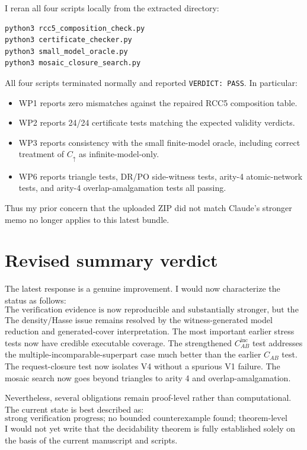 \documentclass[11pt]{article}
\begin{document}
I reran all four scripts locally from the extracted directory:
\begin{verbatim}
python3 rcc5_composition_check.py
python3 certificate_checker.py
python3 small_model_oracle.py
python3 mosaic_closure_search.py
\end{verbatim}
All four scripts terminated normally and reported \texttt{VERDICT: PASS}.  In particular:
\begin{itemize}[leftmargin=2em]
  \item WP1 reports zero mismatches against the repaired RCC5 composition table.
  \item WP2 reports 24/24 certificate tests matching the expected validity verdicts.
  \item WP3 reports consistency with the small finite-model oracle, including correct treatment of \(C_\uparrow\) as infinite-model-only.
  \item WP6 reports triangle tests, DR/PO side-witness tests, arity-4 atomic-network tests, and arity-4 overlap-amalgamation tests all passing.
\end{itemize}

Thus my prior concern that the uploaded ZIP did not match Claude's stronger memo no longer applies to this latest bundle.

\section{Revised summary verdict}

The latest response is a genuine improvement.  I would now characterize the status as follows:
\[
\boxed{\text{The verification evidence is now reproducible and substantially stronger, but the proof is not yet fully certified.}}
\]
The density/Hasse issue remains resolved by the witness-generated model reduction and generated-cover interpretation.  The most important earlier stress tests now have credible executable coverage.  The strengthened \(C_{AB}^{\mathrm{inc}}\) test addresses the multiple-incomparable-superpart case much better than the earlier \(C_{AB}\) test.  The request-closure test now isolates V4 without a spurious V1 failure.  The mosaic search now goes beyond triangles to arity 4 and overlap-amalgamation.

Nevertheless, several obligations remain proof-level rather than computational.  The current state is best described as:
\[
\boxed{\text{strong verification progress; no bounded counterexample found; theorem-level obligations remain.}}
\]
I would not yet write that the decidability theorem is fully established solely on the basis of the current manuscript and scripts.
\end{document}
